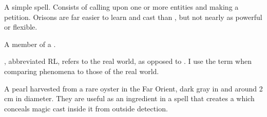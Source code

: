 \begin{gloss}
  
  
  \begin{comment}
  \paragraph{orison}
  \end{comment}
  A simple spell. 
  Consists of calling upon one or more entities and making a petition. 
  Orisons are far easier to learn and cast than , but not nearly as powerful or flexible. 
  
  
  
  \begin{comment}
  \paragraph{\raebar}
  \end{comment}
  \gitem[\raebari]{\raebar}
  \index{\raebar}
  A member of a \baccon. 
  
  
  
  
  
  
  
  \begin{comment}
  \paragraph{Real Life}
  \end{comment}
  , abbreviated RL, refers to the real world, as opposed to \Miith{}. I use the term when comparing \Miithian{} phenomena to those of the real world. 
  
  
  
  
  
  
  
  \begin{comment}
  \paragraph{shade pearl}
  \end{comment}
  A pearl harvested from a rare oyster in the Far Orient, dark gray in \colour and around 2 cm in diameter. They are useful as an ingredient in a spell that creates a  which conceals magic cast inside it from outside detection. 
  
  
  
  
  

\end{gloss}
